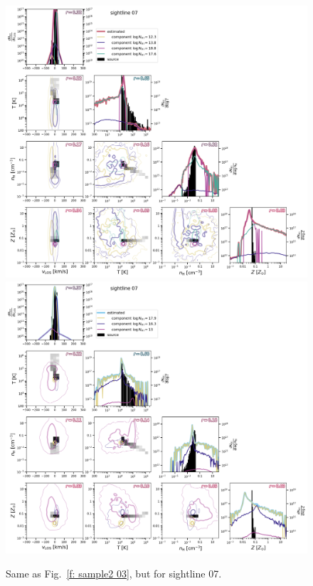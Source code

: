 \documentclass[fleqn,usenatbib]{mnras}
\begin{document}
\begin{figure}
    \centering
    \includegraphics[height=0.45\textheight]{figures/sample2/original/sightline_0007.png}
    \includegraphics[height=0.45\textheight]{figures/sample2/high-z/sightline_0007.png}
    \label{f: sample2 07 corner}
    \caption{Same as Fig.~\ref{f: sample2 03}, but for sightline 07.}
\end{figure}
\end{document}
